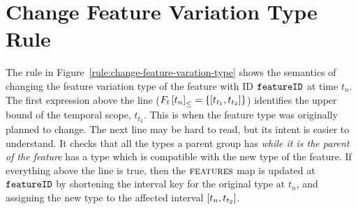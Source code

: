 \section{Change Feature Variation Type Rule}
\label{sec:change-feature-variation-type-rule}
The rule in Figure~\vref{rule:change-feature-varation-type} shows the semantics of changing the feature variation type of the feature with ID $\texttt{featureID}$ at time $t_n$. The first expression above the line ($\containing{F_t}{t_n} = \set{\interval{t_{t_1}}{t_{t_2}}}$) identifies the upper bound of the temporal scope, $t_{t_2}$. This is when the feature type was originally planned to change. The next line may be hard to read, but its intent is easier to understand. It checks that all the types a parent group has \emph{while it is the parent of the feature} has a type which is compatible with the new type of the feature. If everything above the line is true, then the $\textsc{features}{}$ map is updated at $\texttt{featureID}$ by shortening the interval key for the original type at $t_n$, and assigning the new type to the affected interval $\interval{t_n}{t_{t_2}}$. 



